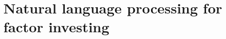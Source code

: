 \documentclass[a4paper,11pt,oneside]{book}
\renewcommand\section{\part}
\begin{document}










\section{Natural language processing for factor investing}

















\end{document}
